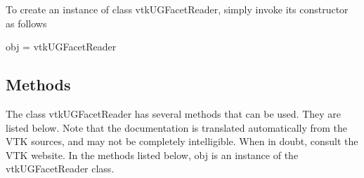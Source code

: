 To create an instance of class vtk\-U\-G\-Facet\-Reader, simply invoke its constructor as follows \begin{DoxyVerb}  obj = vtkUGFacetReader
\end{DoxyVerb}
 \hypertarget{vtkwidgets_vtkxyplotwidget_Methods}{}\subsection{Methods}\label{vtkwidgets_vtkxyplotwidget_Methods}
The class vtk\-U\-G\-Facet\-Reader has several methods that can be used. They are listed below. Note that the documentation is translated automatically from the V\-T\-K sources, and may not be completely intelligible. When in doubt, consult the V\-T\-K website. In the methods listed below, {\ttfamily obj} is an instance of the vtk\-U\-G\-Facet\-Reader class. 
